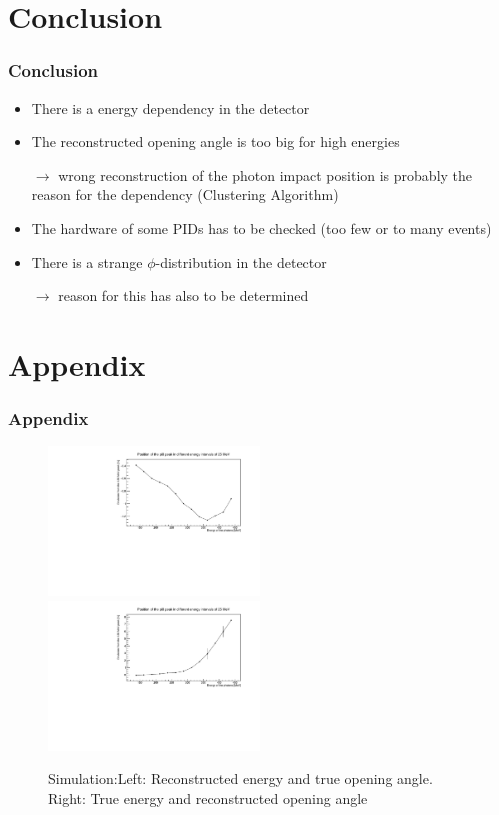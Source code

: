 \documentclass[slidestop,compress,mathserif]{beamer}
\begin{document}
\section{Conclusion}
\begin{frame}
	\frametitle{Conclusion}
	\begin{itemize}
		\item There is a energy dependency in the detector
		\item The reconstructed opening angle is too big for high energies
		
		$\rightarrow$ wrong reconstruction of the photon impact position is probably the reason for the dependency (Clustering Algorithm) 
		\item The hardware of some PIDs has to be checked (too few or to many events)
		\item There is a strange $\phi$-distribution in the detector
		
		$\rightarrow$ reason for this has also to be determined
	\end{itemize}
\end{frame}
\section{Appendix}
\begin{frame}
	\frametitle{Appendix}
	
	\begin{figure}
		\includegraphics[width=0.5\textwidth]{Pictures/20170724RecETrueOAngle}
		\includegraphics[width=0.5\textwidth]{Pictures/20170724TrueERecOAngle}
		\caption{Simulation:Left: Reconstructed energy and true opening angle. Right: True energy and reconstructed opening angle}
	\end{figure}
\end{frame}
\end{document}
